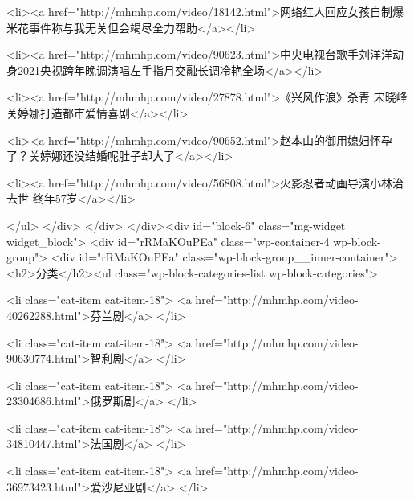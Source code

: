                             <li><a href="http://mhmhp.com/video/18142.html">网络红人回应女孩自制爆米花事件称与我无关但会竭尽全力帮助</a></li>
                            
                            <li><a href="http://mhmhp.com/video/90623.html">中央电视台歌手刘洋洋动身2021央视跨年晚调演唱左手指月交融长调冷艳全场</a></li>
                            
                            <li><a href="http://mhmhp.com/video/27878.html">《兴风作浪》杀青 宋晓峰关婷娜打造都市爱情喜剧</a></li>
                            
                            <li><a href="http://mhmhp.com/video/90652.html">赵本山的御用媳妇怀孕了？关婷娜还没结婚呢肚子却大了</a></li>
                            
                            <li><a href="http://mhmhp.com/video/56808.html">火影忍者动画导演小林治去世 终年57岁</a></li>
                            

                        </ul>
                    </div>
                </div>
            </div><div id="block-6" class="mg-widget widget_block">
                <div id="rRMaKOuPEa"  class="wp-container-4 wp-block-group">
                    <div id="rRMaKOuPEa"  class="wp-block-group__inner-container">
                        <h2>分类</h2><ul class="wp-block-categories-list wp-block-categories">
                            
                            <li class="cat-item cat-item-18">
                                <a href="http://mhmhp.com/video-40262288.html">芬兰剧</a>
                            </li>
                            
                            <li class="cat-item cat-item-18">
                                <a href="http://mhmhp.com/video-90630774.html">智利剧</a>
                            </li>
                            
                            <li class="cat-item cat-item-18">
                                <a href="http://mhmhp.com/video-23304686.html">俄罗斯剧</a>
                            </li>
                            
                            <li class="cat-item cat-item-18">
                                <a href="http://mhmhp.com/video-34810447.html">法国剧</a>
                            </li>
                            
                            <li class="cat-item cat-item-18">
                                <a href="http://mhmhp.com/video-36973423.html">爱沙尼亚剧</a>
                            </li>
                            
